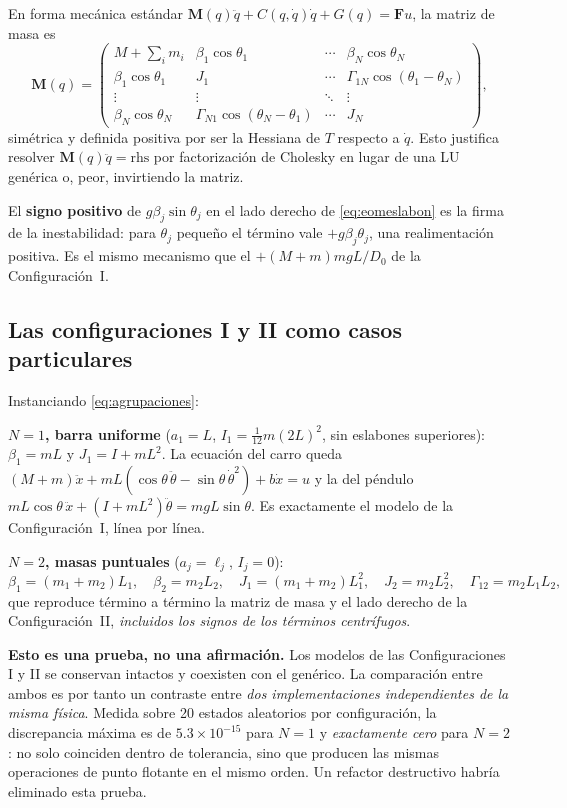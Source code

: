 \documentclass[11pt,letterpaper]{article}
\theoremstyle{definition}
\theoremstyle{plain}
\theoremstyle{remark}
\newcommand{\Mm}{\bm{M}}
\newcommand{\Fm}{\bm{F}}
\begin{document}
En forma mecánica estándar $\Mm(q)\ddot q+C(q,\dot q)\dot q+G(q)=\Fm u$, la
matriz de masa es
\begin{equation}
\Mm(q)=\begin{pmatrix}
M+\sum_i m_i & \beta_1\cos\theta_1 & \cdots & \beta_N\cos\theta_N\\
\beta_1\cos\theta_1 & J_1 & \cdots & \Gamma_{1N}\cos(\theta_1-\theta_N)\\
\vdots & \vdots & \ddots & \vdots\\
\beta_N\cos\theta_N & \Gamma_{N1}\cos(\theta_N-\theta_1) & \cdots & J_N
\end{pmatrix},
\label{eq:massmatrix}
\end{equation}
simétrica y definida positiva por ser la Hessiana de $T$ respecto a $\dot q$.
Esto justifica resolver $\Mm(q)\ddot q=\text{rhs}$ por factorización de Cholesky
en lugar de una LU genérica o, peor, invirtiendo la matriz.

El \textbf{signo positivo} de $g\beta_j\sin\theta_j$ en el lado derecho de
\cref{eq:eomeslabon} es la firma de la inestabilidad: para $\theta_j$ pequeño el
término vale $+g\beta_j\theta_j$, una realimentación positiva. Es el mismo
mecanismo que el $+(M+m)mgL/D_0$ de la Configuración~I.

\subsection{Las configuraciones I y II como casos particulares}
\label{sec:casosparticulares}

Instanciando \cref{eq:agrupaciones}:

\textbf{$N=1$, barra uniforme} ($a_1=L$, $I_1=\tfrac{1}{12}m(2L)^2$, sin
eslabones superiores): $\beta_1=mL$ y $J_1=I+mL^2$. La ecuación del carro queda
$(M+m)\ddot x+mL(\cos\theta\,\ddot\theta-\sin\theta\,\dot\theta^2)+b\dot x=u$ y
la del péndulo $mL\cos\theta\,\ddot x+(I+mL^2)\ddot\theta=mgL\sin\theta$. Es
exactamente el modelo de la Configuración~I, línea por línea.

\textbf{$N=2$, masas puntuales} ($a_j=\ell_j$, $I_j=0$):
\[
\beta_1=(m_1+m_2)L_1,\quad \beta_2=m_2L_2,\quad
J_1=(m_1+m_2)L_1^2,\quad J_2=m_2L_2^2,\quad \Gamma_{12}=m_2L_1L_2,
\]
que reproduce término a término la matriz de masa y el lado derecho de la
Configuración~II, \emph{incluidos los signos de los términos centrífugos}.

\begin{clave}
\small
\textbf{Esto es una prueba, no una afirmación.} Los modelos de las
Configuraciones I y II se conservan intactos y coexisten con el genérico. La
comparación entre ambos es por tanto un contraste entre \emph{dos
implementaciones independientes de la misma física}. Medida sobre 20 estados
aleatorios por configuración, la discrepancia máxima es de $5.3\times10^{-15}$
para $N=1$ y \emph{exactamente cero} para $N=2$: no solo coinciden dentro de
tolerancia, sino que producen las mismas operaciones de punto flotante en el
mismo orden. Un refactor destructivo habría eliminado esta prueba.
\end{clave}
\end{document}

